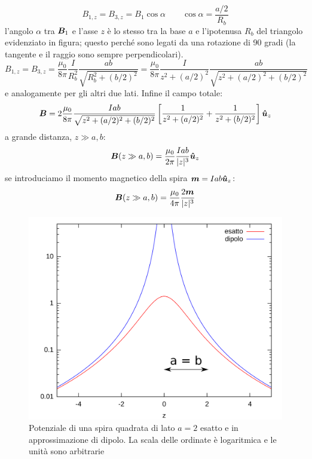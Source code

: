 \begin{Es}
\begin{equation*}
 B_{1,z} = B_{3,z} = B_1\cos\alpha\qquad\cos\alpha = \frac{a/2}{R_b}
\end{equation*}
l'angolo $\alpha$ tra $\boldsymbol{B}_1$ e l'asse $z$ è lo stesso tra la base $a$ e l'ipotenusa $R_b$ del triangolo evidenziato in figura; questo perché sono legati da una rotazione di 90 gradi (la tangente e il raggio sono sempre perpendicolari).
\begin{equation*}
 B_{1,z} = B_{3,z} = \frac{\mu_0}{8\pi}\frac{I}{R_b^2}\frac{ab}{\sqrt{R_b^2+(b/2)^2}} = \frac{\mu_0}{8\pi}\frac{I}{z^2+(a/2)^2}\frac{ab}{\sqrt{z^2+(a/2)^2+(b/2)^2}}
\end{equation*}
e analogamente per gli altri due lati. Infine il campo totale:
\begin{equation*}
 \boldsymbol{B} = 2\frac{\mu_0}{8\pi}\frac{Iab}{\sqrt{z^2+(a/2)^2+(b/2)^2}}\left[\frac{1}{z^2+(a/2)^2}+\frac{1}{z^2+(b/2)^2}\right]\boldsymbol{\hat {u}}_z
\end{equation*}
a grande distanza, $z\gg a,b$:
\begin{equation*}
 \boldsymbol{B} (z\gg a,b) = \frac{\mu_0}{2\pi}\frac{Iab}{|z|^3}\boldsymbol{\hat {u}}_z
\end{equation*}
se introduciamo il momento magnetico della spira $\boldsymbol{m}=Iab\boldsymbol{\hat {u}}_z$:
\begin{equation*}
 \boldsymbol{B} (z\gg a,b) = \frac{\mu_0}{4\pi}\frac{2\boldsymbol{m}}{|z|^3}
\end{equation*}
\begin{figure}[htbp]
 \centering
 \includegraphics[scale=0.5]{immagini/fisica2/potenziale_spira_rettangolare}
 \caption{Potenziale di una spira quadrata di lato $a=2$ esatto e in approssimazione di dipolo. La scala delle ordinate è logaritmica e le unità sono arbitrarie}
\end{figure}
\end{Es}

